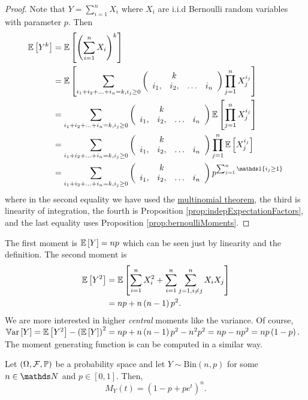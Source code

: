 \begin{proof}
Note that $Y=\sum_{i=1}^{n}X_{i}$ where $X_{i}$ are i.i.d Bernoulli
random variables with parameter $p$. Then
\begin{align*}
\E\left[Y^{k}\right] & =\E\left[\left(\sum_{i=1}^{n}X_{i}\right)^{k}\right]\\
 & =\E\left[\sum_{i_{1}+i_{2}+\ldots+i_{n}=k,i_{j}\geq0}\left(\begin{array}{cccc}
 & k\\
i_{1}, & i_{2}, & \ldots & i_{n}
\end{array}\right)\prod_{j=1}^{n}X_{j}^{i_{j}}\right]\\
 & =\sum_{i_{1}+i_{2}+\ldots+i_{n}=k,i_{j}\geq0}\left(\begin{array}{cccc}
 & k\\
i_{1}, & i_{2}, & \ldots & i_{n}
\end{array}\right)\E\left[\prod_{j=1}^{n}X_{j}^{i_{j}}\right]\\
 & =\sum_{i_{1}+i_{2}+\ldots+i_{n}=k,i_{j}\geq0}\left(\begin{array}{cccc}
 & k\\
i_{1}, & i_{2}, & \ldots & i_{n}
\end{array}\right)\prod_{j=1}^{n}\E\left[X_{j}^{i_{j}}\right]\\
 & =\sum_{i_{1}+i_{2}+\ldots+i_{n}=k,i_{j}\geq0}\left(\begin{array}{cccc}
 & k\\
i_{1}, & i_{2}, & \ldots & i_{n}
\end{array}\right)p^{\sum_{j=1}^{n}\indicate\left\{ i_{j}\geq1\right\} }
\end{align*}
where in the second equality we have used the \hyperref[thm:multinomialTheorem]{multinomial theorem},
the third is linearity of integration, the fourth is Proposition \ref{prop:indepExpectationFactors},
and the last equality uses Proposition \ref{prop:bernoulliMoments}.
\end{proof}
The first moment is $\mathbb{E}\left[Y\right]=np$ which can be seen just
by linearity and the definition. The second moment is
\begin{align*}
\mathbb{E}\left[Y^{2}\right] & =\mathbb{E}\left[\sum_{i=1}^{n}X_{i}^{2}+\sum_{i=1}^{n}\sum_{j=1,i\neq j}^{n}X_{i}X_{j}\right]\\
 & =np+n\left(n-1\right)p^{2}.
\end{align*}
We are more interested in higher \emph{central }moments like the variance.
Of course, $\mathbb{V\mathrm{ar}}\left[Y\right]=\mathbb{E}\left[Y^{2}\right]-\left(\mathbb{E}\left[Y\right]\right)^{2}=np+n\left(n-1\right)p^{2}-n^{2}p^{2}=np-np^{2}=np\left(1-p\right).$
The moment generating function is can be computed in a similar way.
\begin{prop}
\label{prop:mgfBinomial}Let $\left(\Omega,\mathcal{F},\mathbb{\mathbb{\mathbb{P}}}\right)$ be a probability
space and let $Y\sim\mathrm{Bin}\left(n,p\right)$ for some $n\in\N$
and $p\in\left[0,1\right]$. Then,
\[
M_{Y}\left(t\right)=\left(1-p+pe^{t}\right)^{n}.
\]
\end{prop}

